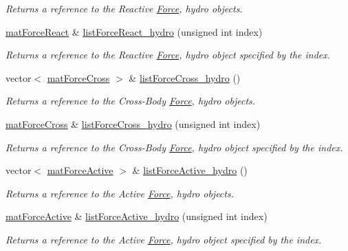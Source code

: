 \begin{DoxyCompactItemize}
\begin{DoxyCompactList}\small\item\em Returns a reference to the Reactive \hyperlink{class_force}{Force}, hydro objects. \end{DoxyCompactList}\item 
\hyperlink{classmat_force_react}{mat\-Force\-React} \& \hyperlink{classmat_body_a052f37c59ad093d92e1155e0b300d1aa}{list\-Force\-React\-\_\-hydro} (unsigned int index)
\begin{DoxyCompactList}\small\item\em Returns a reference to the Reactive \hyperlink{class_force}{Force}, hydro object specified by the index. \end{DoxyCompactList}\item 
vector$<$ \hyperlink{classmat_force_cross}{mat\-Force\-Cross} $>$ \& \hyperlink{classmat_body_a40e3fc33bc7b1685b7f1400312f88f88}{list\-Force\-Cross\-\_\-hydro} ()
\begin{DoxyCompactList}\small\item\em Returns a reference to the Cross-\/\-Body \hyperlink{class_force}{Force}, hydro objects. \end{DoxyCompactList}\item 
\hyperlink{classmat_force_cross}{mat\-Force\-Cross} \& \hyperlink{classmat_body_ad8ce408c1042c080cda0d50a3864fa54}{list\-Force\-Cross\-\_\-hydro} (unsigned int index)
\begin{DoxyCompactList}\small\item\em Returns a reference to the Cross-\/\-Body \hyperlink{class_force}{Force}, hydro object specified by the index. \end{DoxyCompactList}\item 
vector$<$ \hyperlink{classmat_force_active}{mat\-Force\-Active} $>$ \& \hyperlink{classmat_body_a9733e23db05aac47a42cfca88fc9d679}{list\-Force\-Active\-\_\-hydro} ()
\begin{DoxyCompactList}\small\item\em Returns a reference to the Active \hyperlink{class_force}{Force}, hydro objects. \end{DoxyCompactList}\item 
\hyperlink{classmat_force_active}{mat\-Force\-Active} \& \hyperlink{classmat_body_aa1c0587dc82254db28ff71a9cc3261d7}{list\-Force\-Active\-\_\-hydro} (unsigned int index)
\begin{DoxyCompactList}\small\item\em Returns a reference to the Active \hyperlink{class_force}{Force}, hydro object specified by the index. \end{DoxyCompactList}\end{DoxyCompactItemize}
